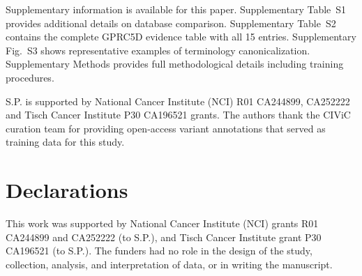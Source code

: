 % 
%
%

\backmatter



Supplementary information is available for this paper. Supplementary Table~S1 provides additional details on database comparison. Supplementary Table~S2 contains the complete GPRC5D evidence table with all 15 entries. Supplementary Fig.~S3 shows representative examples of terminology canonicalization. Supplementary Methods provides full methodological details including training procedures.



S.P. is supported by National Cancer Institute (NCI) R01 CA244899, CA252222 and Tisch Cancer Institute P30 CA196521 grants. The authors thank the CIViC curation team for providing open-access variant annotations that served as training data for this study.


\section*{Declarations}


This work was supported by National Cancer Institute (NCI) grants R01 CA244899 and CA252222 (to S.P.), and Tisch Cancer Institute grant P30 CA196521 (to S.P.). The funders had no role in the design of the study, collection, analysis, and interpretation of data, or in writing the manuscript.

